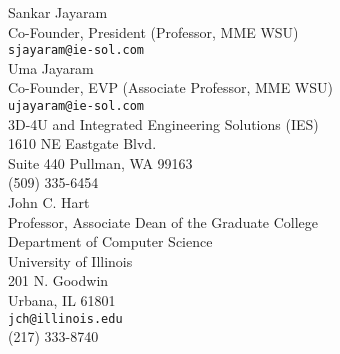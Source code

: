 \documentclass[10pt]{article}
\begin{document}
Sankar Jayaram\\  
Co-Founder, President (Professor, MME WSU)\\
{\tt sjayaram@ie-sol.com} \\
Uma Jayaram \\
Co-Founder, EVP (Associate Professor, MME WSU)\\
{\tt ujayaram@ie-sol.com} \\
3D-4U and Integrated Engineering Solutions (IES) \\
1610 NE Eastgate Blvd. \\
Suite 440 Pullman, WA 99163\\
(509) 335-6454\\

 
John C. Hart\\
Professor, Associate Dean of the Graduate College\\
Department of Computer Science\\
University of Illinois\\
201 N. Goodwin \\
Urbana, IL 61801 \\
{\tt jch@illinois.edu} \\
(217) 333-8740 \\


\end{document}
